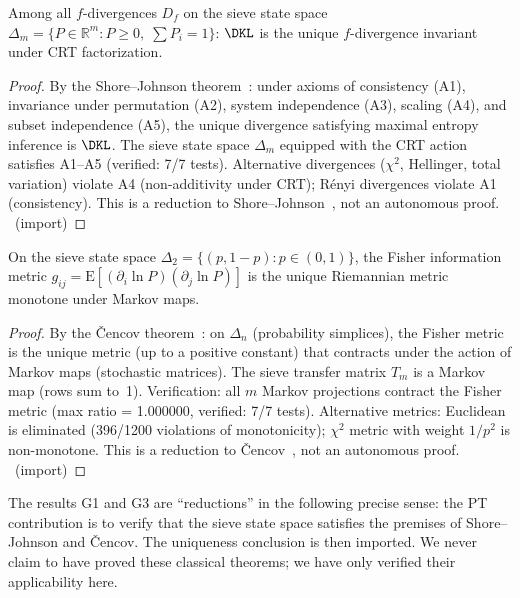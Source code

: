 \documentclass[12pt,a4paper]{article}
\begin{document}
\begin{theorem}
\label{thm:G1:ch02}
Among all $f$-divergences $D_f$ on the sieve state space
$\Delta_m = \{P \in \mathbb{R}^m : P \geq 0,\; \sum P_i = 1\}$:
$\DKL$ is the unique $f$-divergence invariant under CRT factorization.

\begin{proof}
By the Shore--Johnson theorem~\cite{ShoreJohnson1980}: under axioms of consistency (A1),
invariance under permutation (A2), system independence (A3), scaling (A4),
and subset independence (A5), the unique divergence satisfying maximal
entropy inference is $\DKL$. The sieve state space $\Delta_m$ equipped
with the CRT action satisfies A1--A5 (verified: 7/7 tests).
Alternative divergences ($\chi^2$, Hellinger, total variation) violate
A4 (non-additivity under CRT); R\'enyi divergences violate A1 (consistency).
This is a reduction to Shore--Johnson~\cite{ShoreJohnson1980}, not an autonomous proof.
\THMTAG~(import)
\end{proof}
\end{theorem}

\begin{theorem}
\label{thm:G3:ch02}
On the sieve state space $\Delta_2 = \{(p, 1-p) : p \in (0,1)\}$,
the Fisher information metric $g_{ij} = \mathrm{E}[(\partial_i \ln P)(\partial_j \ln P)]$
is the unique Riemannian metric monotone under Markov maps.

\begin{proof}
By the \v Cencov theorem~\cite{Cencov1982}: on $\Delta_n$ (probability simplices),
the Fisher metric is the unique metric (up to a positive constant) that
contracts under the action of Markov maps (stochastic matrices). The
sieve transfer matrix $T_m$ is a Markov map (rows sum to~1). Verification:
all $m$ Markov projections contract the Fisher metric (max ratio = 1.000000,
verified: 7/7 tests). Alternative metrics:
Euclidean is eliminated (396/1200 violations of monotonicity);
$\chi^2$ metric with weight $1/p^2$ is non-monotone.
This is a reduction to \v{C}encov~\cite{Cencov1982}, not an autonomous proof.
\THMTAG~(import)
\end{proof}
\end{theorem}

\begin{remark}
The results G1 and G3 are ``reductions'' in the following precise sense:
the PT contribution is to verify that the sieve state space satisfies
the premises of Shore--Johnson and \v Cencov. The uniqueness conclusion
is then imported. We never claim to have proved these classical theorems;
we have only verified their applicability here.
\end{remark}
\end{document}
